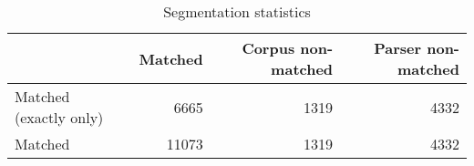 \begin{table}[!ht]
\centering
\begin{tabular}{lrrr}
\toprule
{} &  Matched &  Corpus non-matched &  Parser non-matched \\
\midrule
Matched (exactly only) &     6665 &                1319 &                4332 \\
Matched                &    11073 &                1319 &                4332 \\
\bottomrule
\end{tabular}
\caption{Segmentation statistics}
\label{tab:segmentation-stats}
\end{table}